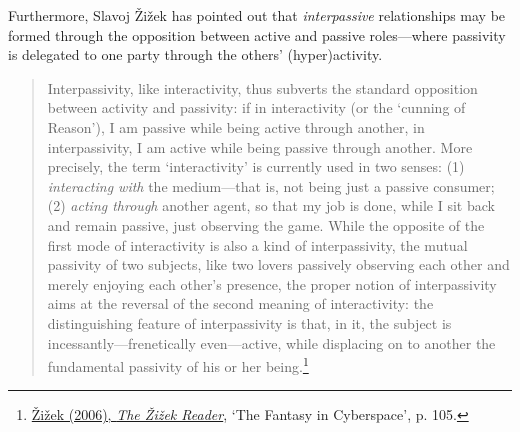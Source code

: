 \hypertarget{zizekinterpassiv}{}
Furthermore, Slavoj \v{Z}i\v{z}ek has pointed out that \emph{interpassive} relationships may be formed through the opposition between active and passive roles---where passivity is delegated to one party through the others' (hyper)activity. 
\begin{quote}
Interpassivity, like interactivity, thus subverts the standard opposition between activity and passivity: if in interactivity (or the `cunning of Reason'), I am passive while being active through another, in interpassivity, I am active while being passive through another. More precisely, the term `interactivity' is currently used in two senses: (1) \emph{interacting with} the medium---that is, not being just a passive consumer; (2) \emph{acting through} another agent, so that my job is done, while I sit back and remain passive, just observing the game. While the opposite of the first mode of interactivity is also a kind of interpassivity, the mutual passivity of two subjects, like two lovers passively observing each other and merely enjoying each other's presence, the proper notion of interpassivity aims at the reversal of the second meaning of interactivity: the distinguishing feature of interpassivity is that, in it, the subject is incessantly---frenetically even---active, while displacing on to another the fundamental passivity of his or her being.\footnote{\hyperlink{zizekreader}{\v{Z}i\v{z}ek (2006), \emph{The \v{Z}i\v{z}ek Reader}}, `The Fantasy in Cyberspace', p. 105.}
\end{quote}
